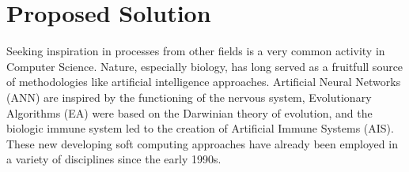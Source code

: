   






\section{Proposed Solution}

Seeking inspiration in processes from other fields is a very common activity in Computer Science. Nature, especially biology, has long served as a fruitfull source of methodologies like artificial intelligence approaches. Artificial Neural Networks (ANN) are inspired by the functioning of the nervous system, Evolutionary Algorithms (EA) were based on the Darwinian theory of evolution, and the biologic immune system led to the creation of Artificial Immune Systems (AIS). These new developing soft computing approaches have already been employed in a variety of disciplines since the early 1990s. 

